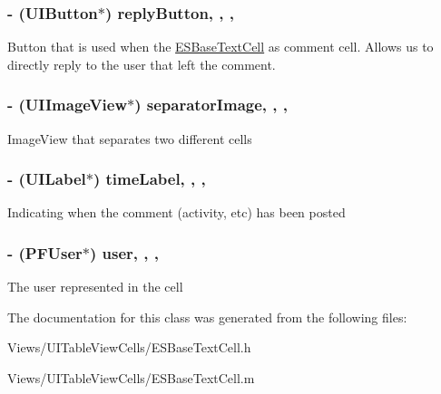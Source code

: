 \subsubsection[{reply\+Button}]{\setlength{\rightskip}{0pt plus 5cm}-\/ (U\+I\+Button$\ast$) reply\+Button\hspace{0.3cm}{\ttfamily [read]}, {\ttfamily [write]}, {\ttfamily [nonatomic]}, {\ttfamily [strong]}}\label{interface_e_s_base_text_cell_a9ce7dfc74d6bba195bd1036f98e5375b}
Button that is used when the \hyperlink{interface_e_s_base_text_cell}{E\+S\+Base\+Text\+Cell} as comment cell. Allows us to directly reply to the user that left the comment. \hypertarget{interface_e_s_base_text_cell_a96269b10810df372b3661d2c58e471d6}{}
\subsubsection[{separator\+Image}]{\setlength{\rightskip}{0pt plus 5cm}-\/ (U\+I\+Image\+View$\ast$) separator\+Image\hspace{0.3cm}{\ttfamily [read]}, {\ttfamily [write]}, {\ttfamily [nonatomic]}, {\ttfamily [strong]}}\label{interface_e_s_base_text_cell_a96269b10810df372b3661d2c58e471d6}
Image\+View that separates two different cells \hypertarget{interface_e_s_base_text_cell_ae5d9c5a4863daeeb7ff40486a5429f38}{}
\subsubsection[{time\+Label}]{\setlength{\rightskip}{0pt plus 5cm}-\/ (U\+I\+Label$\ast$) time\+Label\hspace{0.3cm}{\ttfamily [read]}, {\ttfamily [write]}, {\ttfamily [nonatomic]}, {\ttfamily [strong]}}\label{interface_e_s_base_text_cell_ae5d9c5a4863daeeb7ff40486a5429f38}
Indicating when the comment (activity, etc) has been posted \hypertarget{interface_e_s_base_text_cell_abde10378758e52da264c20fa64f09b6c}{}
\subsubsection[{user}]{\setlength{\rightskip}{0pt plus 5cm}-\/ (P\+F\+User$\ast$) user\hspace{0.3cm}{\ttfamily [read]}, {\ttfamily [write]}, {\ttfamily [nonatomic]}, {\ttfamily [strong]}}\label{interface_e_s_base_text_cell_abde10378758e52da264c20fa64f09b6c}
The user represented in the cell 

The documentation for this class was generated from the following files\+:\begin{DoxyCompactItemize}
\item 
Views/\+U\+I\+Table\+View\+Cells/E\+S\+Base\+Text\+Cell.\+h\item 
Views/\+U\+I\+Table\+View\+Cells/E\+S\+Base\+Text\+Cell.\+m\end{DoxyCompactItemize}
